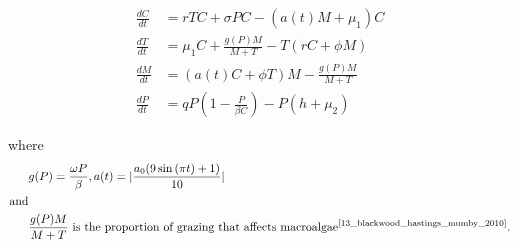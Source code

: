 \documentclass[12pt]{article}
\begin{document}
\begin{align}
    \frac{dC}{dt} &= rTC + \sigma P C- (a(t)M+\mu_{1})C \label{eq:dCdt}\\
    \frac{dT}{dt} &= \mu_{1}C + \frac{g(P)M}{M+T} - T(rC+\phi M) \label{eq:dTdt} \\ 
    \frac{dM}{dt} &= (a(t)C+ \phi T)M - \frac{g(P)M}{M+T} \label{eq:dMdt}\\
    \frac{dP}{dt} &= qP \left( 1-\frac{P}{\beta C} \right) - P \left( h+\mu_{2} \right) \label{eq:diff_eqs}
\end{align}

where 
\begin{align*}
&g(P) = \frac{\omega P}{\beta}, a(t)=|\frac{a_{0}(9\sin{(\pi t) }+1)}{10}|\\
\text{and} \\
&\frac{g(P)M}{M + T} \text{ is the proportion of grazing that affects macroalgae} \textsuperscript{\cite{13_blackwood_hastings_mumby_2010}}.
\end{align*}

\end{document}
